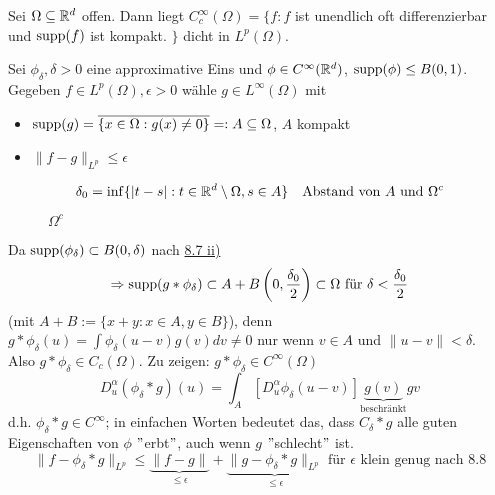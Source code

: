 \begin{kor} \label{kor:8.9}
	Sei $\Omega \subseteq \mathbb{R}^{d}$ offen. Dann liegt $C_{c}^{\infty}(\Omega) = \{ f : f $ ist unendlich oft differenzierbar und $\operatorname{supp}(f)$ ist kompakt. $\}$ dicht in $L^{p}(\Omega)$.
	\begin{beweis}
		Sei $\phi_{\delta}, \delta > 0$ eine approximative Eins und $\phi \in C^{\infty}(\mathbb{R}^{d})$, $\operatorname{supp}(\phi) \leq B(0, 1)$. \\
		Gegeben $f \in L^{p}(\Omega), \epsilon > 0$ wähle $g \in L^{\infty}(\Omega)$ mit
		\begin{itemize}
			\item $\operatorname{supp}(g) = \overline{\{ x \in \Omega: g(x) \neq 0 \}} =: A \subseteq \Omega$, $A$ kompakt
			\item $\| f - g \|_{L^{p}} \leq \epsilon$
		\end{itemize}
		\[ \delta_{0} = \inf \{ |t - s| : t \in \mathbb{R}^{d} \setminus \Omega, s \in A \} \quad \text{Abstand von } A \text{ und } \Omega^{c} \]

		\def\side{0.58}
		\begin{figure}[H]
			\centering		
			\hskip 0pt \parbox{4pt}{ $\Omega^{c}$ }
		\end{figure}
		
		Da $\operatorname{supp}(\phi_{\delta}) \subset B(0, \delta)$ nach \hyperref[bem:8.7ii]{8.7 ii)}
		\[ \Rightarrow \operatorname{supp}(g \ast \phi_{\delta} ) \subset A + B\left(0, \frac{\delta_{0}}{2}\right) \subset \Omega \text{ für } \delta < \frac{\delta_{0}}{2} \]
		(mit $A + B := \{ x + y : x \in A, y \in B\}$), denn $g \ast \phi_{\delta}(u) = \int \phi_{\delta}(u - v) g(v) dv \neq 0$ nur wenn $v \in A$ und $\| u - v \| < \delta$. \\
		Also $g \ast \phi_{\delta} \in C_{c}(\Omega)$. Zu zeigen: $g \ast \phi_{\delta} \in C^{\infty}(\Omega)$
		\[ D_{u}^{\alpha}(\phi_{\delta} \ast g)(u) = \int_{A} \left[ D_{u}^{\alpha} \phi_{\delta}(u - v) \right] \underbrace{g(v)}_{\text{beschränkt}} gv \]
		d.h. $\phi_{\delta} \ast g \in C	^{\infty}$; in einfachen Worten bedeutet das, dass $C_{\delta} \ast g$ alle guten Eigenschaften von $\phi$ $"$erbt$"$, auch wenn $g$ $"$schlecht$"$ ist. \\
		\[ \| f - \phi_{\delta} \ast g \|_{L^{p}} \leq \underbrace{\| f - g \|}_{\leq \epsilon} + \underbrace{\| g - \phi_{\delta} \ast g \|_{L^{p}}}_{\leq \epsilon} \text{ für } \epsilon \text{ klein genug nach } \hyperref[satz:8.8]{8.8} \]
	\end{beweis}
\end{kor}



